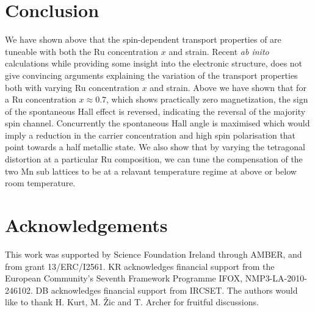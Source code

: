 \documentclass[reprint,aip,apl,floatfix,linenumbers,superscriptaddress]{revtex4-1}
\begin{document}
\section{Conclusion}
\label{sec:conclusion}
We have shown above that the spin-dependent transport properties of  are tuneable with both the Ru concentration $x$ and strain. Recent 
\textit{ab inito} calculations \cite{galanakisJAP2013} while providing some 
insight into the electronic structure, does not give convincing arguments 
explaining the variation of the transport properties both with varying Ru 
concentration $x$ and strain. Above we have shown that for a Ru concentration 
$x\approx\num{0.7}$, which shows practically zero magnetization, the sign of 
the spontaneous Hall effect is reversed, indicating the reversal of the 
majority spin channel. Concurrently the spontaneous Hall angle is maximised 
which would imply a reduction in the carrier concentration and high spin 
polarisation that point towards a half metallic state. We also show that by 
varying the tetragonal distortion at a particular Ru composition, we can tune 
the compensation of the two Mn sub lattices to be at a relavant temperature 
regime at above or below room temperature. 
 
\section{Acknowledgements}
\label{sec:acknowledgements}
This work was supported by Science Foundation Ireland through AMBER, and from 
grant 13/ERC/I2561. KR acknowledges financial support from the European 
Community's Seventh Framework Programme IFOX, NMP3-LA-2010-246102. DB 
acknowledges financial support from IRCSET. The authors would like to thank 
H. Kurt, M. \v{Z}ic and T. Archer for fruitful discussions.


\end{document}
